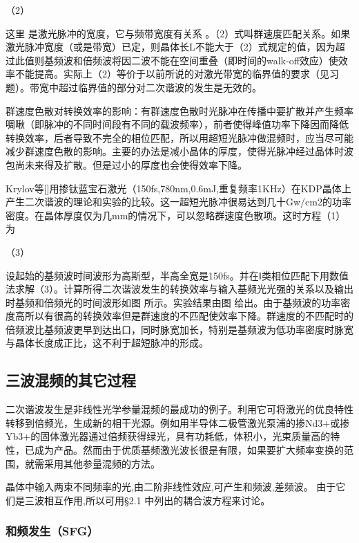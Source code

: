                                                          （2）

这里 是激光脉冲的宽度，它与频带宽度有关系 。（2）式叫群速度匹配关系。如果激光脉冲宽度（或是带宽）已定，则晶体长L不能大于（2）式规定的值，因为超过此值则基频波和倍频波将因二波不能在空间重叠（即时间的walk-off效应）使效率不能提高。实际上（2）等价于以前所说的对激光带宽的临界值的要求（见习题）。带宽中超过临界值的部分对二次谐波的发生是无效的。

群速度色散对转换效率的影响：有群速度色散时光脉冲在传播中要扩散并产生频率啁啾（即脉冲的不同时间段有不同的载波频率），前者使得峰值功率下降因而降低转换效率，后者导致不完全的相位匹配，所以用超短光脉冲做混频时，应当尽可能减少群速度色散的影响。主要的办法是减小晶体的厚度，使得光脉冲经过晶体时波包尚未来得及扩散。但是过小的厚度也会使得效率下降。

Krylov等[]用掺钛蓝宝石激光（150fs,780nm,0.6mJ,重复频率1KHz）在KDP晶体上产生二次谐波的理论和实验的比较。这一超短光脉冲很易达到几十Gw/cm2的功率密度。在晶体厚度仅为几mm的情况下，可以忽略群速度色散项。这时方程（1）为

                （3）

设起始的基频波时间波形为高斯型，半高全宽是150fs。并在Ⅰ类相位匹配下用数值法求解（3）。计算所得二次谐波发生的转换效率与输入基频光光强的关系以及输出时基频和倍频光的时间波形如图 所示。实验结果由图 给出。由于基频波的功率密度高所以有很高的转换效率但是群速度的不匹配使效率下降。群速度的不匹配时的倍频波比基频波更早到达出口，同时脉宽加长，特别是基频波为低功率密度时脉宽与晶体长度成正比，这不利于超短脉冲的形成。

\subsection{三波混频的其它过程}

二次谐波发生是非线性光学参量混频的最成功的例子。利用它可将激光的优良特性转移到倍频光，生成新的相干光源。例如用半导体二极管激光泵浦的掺Nd3+或掺Yb3+的固体激光器通过倍频获得绿光，具有功耗低，体积小，光束质量高的特性，已成为产品。然而由于优质基频激光波长很是有限，如果要扩大频率变换的范围，就需采用其他参量混频的方法。

晶体中输入两束不同频率的光,由二阶非线性效应,可产生和频波,差频波。 由于它们是三波相互作用,所以可用§2.1 中列出的耦合波方程来讨论。

\subsubsection{和频发生（SFG）}


